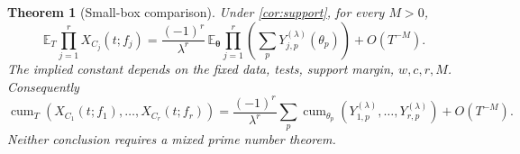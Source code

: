 \documentclass[11pt,reqno]{amsart}
\numberwithin{equation}{section}
\newtheorem{theorem}{Theorem}[section]
\theoremstyle{definition}
\theoremstyle{remark}
\begin{document}
\begin{theorem}[Small-box comparison]\label{cor:comparison}
Under \eqref{cor:support}, for every $M>0$,
\begin{equation}\mathbb E_T\prod_{j=1}^rX_{C_j}(t;f_j)
=\frac{(-1)^r}{\lambda^r}\,
\mathbb E_{\boldsymbol\theta}\prod_{j=1}^r
 \left(\sum_pY_{j,p}^{(\lambda)}(\theta_p)\right)+O(T^{-M}).\label{cor:moment-comparison}\end{equation}
The implied constant depends on the fixed data, tests, support margin, $w,c,r,M$. Consequently
\begin{equation}\operatorname{cum}_T(X_{C_1}(t;f_1),\ldots,X_{C_r}(t;f_r))
=\frac{(-1)^r}{\lambda^r}\sum_p
\operatorname{cum}_{\theta_p}(Y_{1,p}^{(\lambda)},\ldots,Y_{r,p}^{(\lambda)})
+O(T^{-M}).\label{cor:cumulant-comparison}\end{equation}
Neither conclusion requires a mixed prime number theorem.
\end{theorem}
\end{document}
